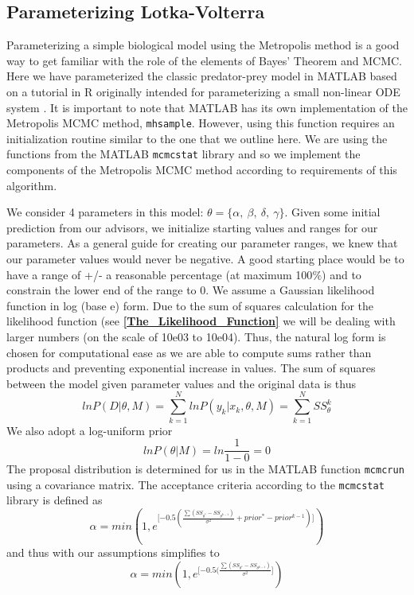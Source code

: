 \documentclass{article}
\begin{document}
\subsection{Parameterizing Lotka-Volterra} Parameterizing a simple biological model using the Metropolis method is a good way to get familiar with the role of the elements of Bayes' Theorem and MCMC. Here we have parameterized the classic predator-prey model in MATLAB based on a tutorial in R originally intended for parameterizing a small non-linear ODE system \cite{mcmcstatlib}. It is important to note that MATLAB has its own implementation of the Metropolis MCMC method, \texttt{mhsample}. However, using this function requires an initialization routine similar to the one that we outline here. We are using the functions from the MATLAB \texttt{mcmcstat} library \cite{mcmcstatlib} and so we implement the components of the Metropolis MCMC method according to requirements of this algorithm. 
\par We consider 4 parameters in this model: $\theta = \{ \alpha, \: \beta,\: \delta,\: \gamma \}$. Given some initial prediction from our advisors, we initialize starting values and ranges for our parameters. As a general guide for creating our parameter ranges, we knew that our parameter values would never be negative. A good starting place would be to have a range of +/- a reasonable percentage (at maximum 100$\%$) and to constrain the lower end of the range to 0. We assume a Gaussian likelihood function in log (base e) form. Due to the sum of squares calculation for the likelihood function (see \textbf{\ref{The_Likelihood_Function}} we will be dealing with larger numbers (on the scale of 10e03 to 10e04). Thus, the natural log form is chosen for computational ease as we are able to compute sums rather than products and preventing exponential increase in values. The sum of squares between the model given parameter values and the original data is thus
\begin{equation} \label{eq:13mcmc}
lnP(D|\theta, M) = \sum_{k=1}^{N}lnP(y_k|x_k,\theta,M) = \sum_{k=1}^N SS_\theta^k
\end{equation}
 We also adopt a log-uniform prior
\begin{equation} \label{eq:14mcmc}
lnP(\theta|M) = ln\frac{1}{1-0} = 0
\end{equation}
The proposal distribution is determined for us in the MATLAB function \texttt{mcmcrun} using a covariance matrix. The acceptance criteria according to the \texttt{mcmcstat} library is defined as
\begin{equation} \label{eq:15mcmc}
\alpha = min(1, e^{ \lbrack {-0.5(\frac{\sum (SS_{\theta^*}-SS_{\theta^{k-1}})}{\sigma^2} + prior^*-prior^{k-1})} \rbrack})
\end{equation}
and thus with our assumptions simplifies to 
\begin{equation} \label{eq:16mcmc}
\alpha = min(1, e^{[ {-0.5(\frac{\sum (SS_{\theta^*}-SS_{\theta^{k-1}})}{\sigma^2}]}})
\end{equation}
\end{document}
